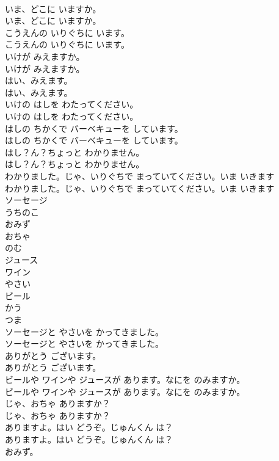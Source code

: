 \documentclass[8pt]{extreport}
\begin{document}
\begin{CJK}{UTF8}{min}
\\	いま、どこに いますか。
\\	いま、どこに いますか。
\\	こうえんの いりぐちに います。
\\	こうえんの いりぐちに います。
\\	いけが みえますか。
\\	いけが みえますか。
\\	はい、みえます。
\\	はい、みえます。
\\	いけの はしを わたってください。
\\	いけの はしを わたってください。
\\	はしの ちかくで バーベキューを しています。
\\	はしの ちかくで バーベキューを しています。
\\	はし？ん？ちょっと わかりません。
\\	はし？ん？ちょっと わかりません。
\\	わかりました。じゃ、いりぐちで まっていてください。いま いきます
\\	わかりました。じゃ、いりぐちで まっていてください。いま いきます
\\	ソーセージ
\\	うちのこ
\\	おみず
\\	おちゃ
\\	のむ
\\	ジュース
\\	ワイン
\\	やさい
\\	ビール
\\	かう
\\	つま
\\	ソーセージと やさいを かってきました。
\\	ソーセージと やさいを かってきました。
\\	ありがとう ございます。
\\	ありがとう ございます。
\\	ビールや ワインや ジュースが あります。なにを のみますか。
\\	ビールや ワインや ジュースが あります。なにを のみますか。
\\	じゃ、おちゃ ありますか？
\\	じゃ、おちゃ ありますか？
\\	ありますよ。はい どうぞ。じゅんくん は？
\\	ありますよ。はい どうぞ。じゅんくん は？
\\	おみず。

\end{CJK}
\end{document}
